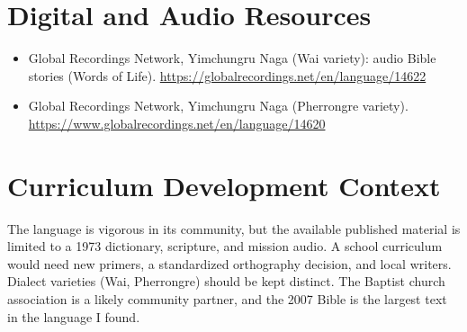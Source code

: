 \documentclass[12pt]{article}
\begin{document}
\section{Digital and Audio Resources}
\begin{itemize}
\item Global Recordings Network, Yimchungru Naga (Wai variety): audio Bible stories (Words of Life). \url{https://globalrecordings.net/en/language/14622}
\item Global Recordings Network, Yimchungru Naga (Pherrongre variety). \url{https://www.globalrecordings.net/en/language/14620}
\end{itemize}

\section{Curriculum Development Context}
The language is vigorous in its community, but the available published material is limited to a 1973 dictionary, scripture, and mission audio. A school curriculum would need new primers, a standardized orthography decision, and local writers. Dialect varieties (Wai, Pherrongre) should be kept distinct. The Baptist church association is a likely community partner, and the 2007 Bible is the largest text in the language I found.
\end{document}
